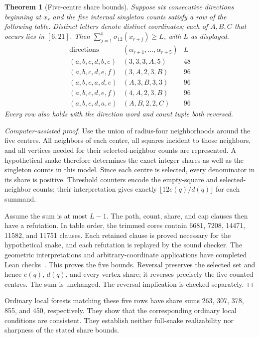 \documentclass[11pt,a4paper]{article}
\newtheorem{theorem}{Theorem}[section]
\theoremstyle{definition}
\theoremstyle{remark}
\begin{document}
\begin{theorem}[Five-centre share bounds]\label{thm:five-shares}
Suppose six consecutive directions beginning at $x_r$ and the five internal singleton counts satisfy a row of the following table. Distinct letters denote distinct coordinates; each of $A,B,C$ that occurs lies in $[6,21]$. Then $\sum_{j=1}^{5}\sigma_{12}(x_{r+j})\ge L$, with $L$ as displayed.
\[
\begin{array}{c|c|r}
\text{directions}&(\alpha_{r+1},\ldots,\alpha_{r+5})&L\\\hline
(a,b,c,d,b,e)&(3,3,3,A,5)&48\\
(a,b,c,d,e,f)&(3,A,2,3,B)&96\\
(a,b,c,a,d,e)&(A,3,B,3,3)&96\\
(a,b,c,d,e,f)&(4,A,2,3,B)&96\\
(a,b,c,d,a,e)&(A,B,2,2,C)&96
\end{array}
\]
Every row also holds with the direction word and count tuple both reversed.
\end{theorem}
\begin{proof}[Computer-assisted proof]
Use the union of radius-four neighborhoods around the five centres. All neighbors of each centre, all squares incident to those neighbors, and all vertices needed for their selected-neighbor counts are represented. A hypothetical snake therefore determines the exact integer shares as well as the singleton counts in this model. Since each centre is selected, every denominator in its share is positive. Threshold counters encode the empty-square and selected-neighbor counts; their interpretation gives exactly $\lfloor12e(q)/d(q)\rfloor$ for each summand.

Assume the sum is at most $L-1$. The path, count, share, and cap clauses then have a refutation. In table order, the trimmed cores contain 6681, 7208, 14471, 11582, and 11751 clauses. Each retained clause is proved necessary for the hypothetical snake, and each refutation is replayed by the sound checker. The geometric interpretations and arbitrary-coordinate applications have completed Lean checks~\cite{recentarchive}. This proves the five bounds. Reversal preserves the selected set and hence $e(q)$, $d(q)$, and every vertex share; it reverses precisely the five counted centres. The sum is unchanged. The reversal implication is checked separately.
\end{proof}
Ordinary local forests matching these five rows have share sums 263, 307, 378, 855, and 450, respectively. They show that the corresponding ordinary local conditions are consistent. They establish neither full-snake realizability nor sharpness of the stated share bounds.
\end{document}
